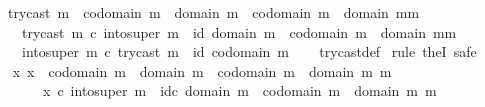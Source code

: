 \begin{isabellebody}
\ \ \ {\isachardoublequoteopen}try{\isacharunderscore}{\kern0pt}cast\ m\ {\isacharcolon}{\kern0pt}\ codomain\ m\ {\isasymrightarrow}\ {\isacharparenleft}{\kern0pt}domain\ m{\isacharparenright}{\kern0pt}\ {\isasymCoprod}\ {\isacharparenleft}{\kern0pt}{\isacharparenleft}{\kern0pt}codomain\ m{\isacharparenright}{\kern0pt}\ {\isasymsetminus}\ {\isacharparenleft}{\kern0pt}{\isacharparenleft}{\kern0pt}domain\ m{\isacharparenright}{\kern0pt}{\isacharcomma}{\kern0pt}m{\isacharparenright}{\kern0pt}{\isacharparenright}{\kern0pt}\isanewline
\ \ \ \ {\isasymand}\ try{\isacharunderscore}{\kern0pt}cast\ m\ {\isasymcirc}\isactrlsub c\ into{\isacharunderscore}{\kern0pt}super\ m\ {\isacharequal}{\kern0pt}\ id\ {\isacharparenleft}{\kern0pt}{\isacharparenleft}{\kern0pt}domain\ m{\isacharparenright}{\kern0pt}\ {\isasymCoprod}\ {\isacharparenleft}{\kern0pt}{\isacharparenleft}{\kern0pt}codomain\ m{\isacharparenright}{\kern0pt}\ {\isasymsetminus}\ {\isacharparenleft}{\kern0pt}{\isacharparenleft}{\kern0pt}domain\ m{\isacharparenright}{\kern0pt}{\isacharcomma}{\kern0pt}m{\isacharparenright}{\kern0pt}{\isacharparenright}{\kern0pt}{\isacharparenright}{\kern0pt}\isanewline
\ \ \ \ {\isasymand}\ into{\isacharunderscore}{\kern0pt}super\ m\ {\isasymcirc}\isactrlsub c\ try{\isacharunderscore}{\kern0pt}cast\ m\ {\isacharequal}{\kern0pt}\ id\ {\isacharparenleft}{\kern0pt}codomain\ m{\isacharparenright}{\kern0pt}{\isachardoublequoteclose}\isanewline
%
\isadelimproof
\ \ %
\endisadelimproof
%
\isatagproof
{}\isamarkupfalse%
\ try{\isacharunderscore}{\kern0pt}cast{\isacharunderscore}{\kern0pt}def\isanewline
{}\isamarkupfalse%
\ {\isacharparenleft}{\kern0pt}rule\ theI{\isacharprime}{\kern0pt}{\isacharcomma}{\kern0pt}\ safe{\isacharparenright}{\kern0pt}\isanewline
\ \ \isamarkupfalse%
\ {\isachardoublequoteopen}{\isasymexists}x{\isachardot}{\kern0pt}\ x\ {\isacharcolon}{\kern0pt}\ codomain\ m\ {\isasymrightarrow}\ domain\ m\ {\isasymCoprod}\ {\isacharparenleft}{\kern0pt}codomain\ m\ {\isasymsetminus}\ {\isacharparenleft}{\kern0pt}domain\ m{\isacharcomma}{\kern0pt}\ m{\isacharparenright}{\kern0pt}{\isacharparenright}{\kern0pt}\ {\isasymand}\isanewline
\ \ \ \ \ \ \ \ x\ {\isasymcirc}\isactrlsub c\ into{\isacharunderscore}{\kern0pt}super\ m\ {\isacharequal}{\kern0pt}\ id\isactrlsub c\ {\isacharparenleft}{\kern0pt}domain\ m\ {\isasymCoprod}\ {\isacharparenleft}{\kern0pt}codomain\ m\ {\isasymsetminus}\ {\isacharparenleft}{\kern0pt}domain\ m{\isacharcomma}{\kern0pt}\ m{\isacharparenright}{\kern0pt}{\isacharparenright}{\kern0pt}{\isacharparenright}{\kern0pt}\ {\isasymand}\isanewline

\end{isabellebody}
